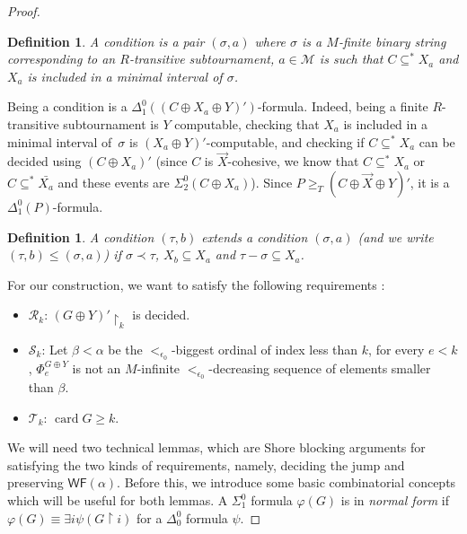 \documentclass{article}
\numberwithin{theorem}{section}
\newtheorem{definition}[theorem]{Definition}
\newcommand{\WF}{\mathsf{WF}}
\newcommand{\M}{\mathcal{M}}
\newcommand{\uh}[0]{{\upharpoonright}}
\newcommand{\card}{\operatorname{card}}
\begin{document}
\begin{proof}
\begin{definition}
A condition is a pair $(\sigma,a)$ where $\sigma$ is a $M$-finite binary string corresponding to an $R$-transitive subtournament, $a \in \M$ is such that $C \subseteq^* X_a$ and $X_a$ is included in a minimal interval of $\sigma$.
\end{definition}

Being a condition is a $\Delta_1^0((C \oplus X_a \oplus Y)')$-formula. Indeed, being a finite $R$-transitive subtournament is $Y$ computable, checking that $X_a$ is included in a minimal interval of~$\sigma$ is $(X_a \oplus Y)'$-computable, and checking if $C \subseteq^* X_{a}$ can be decided using $(C \oplus X_a)'$ (since $C$ is $\vec{X}$-cohesive, we know that $C \subseteq^* X_a$ or $C \subseteq^* \bar{X_a}$ and these events are $\Sigma_2^0(C \oplus X_a)$). Since $P \geq_T (C \oplus \vec{X} \oplus Y)'$, it is a $\Delta_1^0(P)$-formula.

\begin{definition}
A condition $(\tau,b)$ extends a condition $(\sigma,a)$ (and we write $(\tau,b) \leq (\sigma,a)$) if $\sigma \prec \tau$, $X_b \subseteq X_a$ and $\tau - \sigma \subseteq X_a$.
\end{definition}


For our construction, we want to satisfy the following requirements :
\begin{itemize}
    \item $\mathcal{R}_k$: $(G \oplus Y)' \uh_k$ is decided.
    \item $\mathcal{S}_{k}$: Let $\beta < \alpha$ be the $<_{\epsilon_0}$-biggest ordinal of index less than $k$, for every $e < k$, $\Phi_e^{G \oplus Y}$ is not an $M$-infinite $<_{\epsilon_0}$-decreasing sequence of elements smaller than $\beta$.
    \item $\mathcal{T}_k$: $\card G \geq k$.
\end{itemize}

We will need two technical lemmas, which are Shore blocking arguments for satisfying the two kinds of requirements, namely, deciding the jump and preserving $\WF(\alpha)$. Before this, we introduce some basic combinatorial concepts which will be useful for both lemmas. A $\Sigma^0_1$ formula $\varphi(G)$ is in \emph{normal form} if $\varphi(G) \equiv \exists i \psi(G \uh i)$ for a $\Delta^0_0$ formula $\psi$.


\end{proof}
\end{document}
